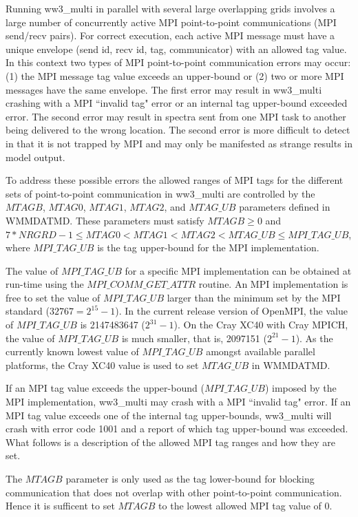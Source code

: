 Running {\file ww3\_multi} in parallel with several large overlapping
grids involves a large number of concurrently active MPI point-to-point
communications (MPI send/recv pairs).  For correct execution, each active
MPI message must have a unique envelope (send id, recv id, tag, communicator)
with an allowed tag value.  In this context two types of MPI point-to-point
communication errors may occur:
(1) the MPI message tag value exceeds an upper-bound or
(2) two or more MPI messages have the same envelope.
The first error may result in {\file ww3\_multi} crashing with
a MPI ``invalid tag" error or an internal tag upper-bound exceeded error.
The second error may result in spectra sent from one MPI task to another being
delivered to the wrong location.  The second error is more difficult to detect
in that it is not trapped by MPI and may only be manifested as strange results
in model output.

To address these possible errors the allowed ranges of MPI tags for the different
sets of point-to-point communication in {\file ww3\_multi} are controlled by the
$MTAGB$, $MTAG0$, $MTAG1$, $MTAG2$, and $MTAG\_UB$ parameters defined in {\file WMMDATMD}.
These parameters must satisfy
$MTAGB \geq 0$ and $7*NRGRD-1 \leq MTAG0 < MTAG1 < MTAG2 < MTAG\_UB \leq MPI\_TAG\_UB$,
where $MPI\_TAG\_UB$ is the tag upper-bound for the MPI implementation.

The value of $MPI\_TAG\_UB$ for a specific MPI implementation can be obtained at
run-time using the $MPI\_COMM\_GET\_ATTR$ routine.
An MPI implementation is free to set the value of $MPI\_TAG\_UB$ larger than
the minimum set by the MPI standard ($32767 = 2^{15}-1$).
In the current release version of OpenMPI, the value of $MPI\_TAG\_UB$ is
2147483647 ($2^{31}-1$).
On the Cray XC40 with Cray MPICH, the value of $MPI\_TAG\_UB$ is much smaller,
that is, 2097151 ($2^{21}-1$).
As the currently known lowest value of $MPI\_TAG\_UB$ amongst available parallel
platforms, the Cray XC40 value is used to set $MTAG\_UB$ in {\file WMMDATMD}.

If an MPI tag value exceeds the upper-bound ($MPI\_TAG\_UB$) imposed by the MPI
implementation, {\file ww3\_multi} may crash with a MPI ``invalid tag" error.
If an MPI tag value exceeds one of the internal tag upper-bounds, {\file ww3\_multi}
will crash with error code 1001 and a report of which tag upper-bound was exceeded.
What follows is a description of the allowed MPI tag ranges and how they are set.

The $MTAGB$ parameter is only used as the tag lower-bound for blocking communication
that does not overlap with other point-to-point communication.
Hence it is sufficent to set $MTAGB$ to the lowest allowed MPI tag value of 0.

